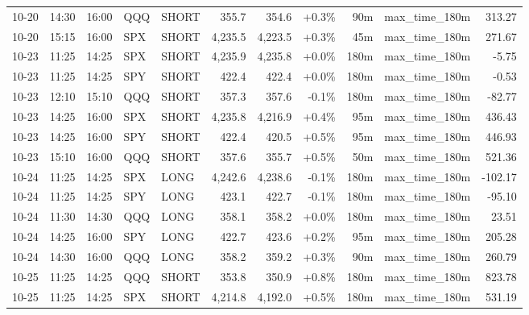 \documentclass[11pt,a4paper,twoside]{article}
\begin{document}
\begin{center}
\begin{longtable}{>{\color{txtmain}}l l l l l r r r r >{\color{txtmain}}l r}
10-20 & 14:30 & 16:00 & QQQ & SHORT & 355.7 & 354.6 & \textcolor{wingreen}{+0.3\%} & 90m & max\_time\_180m & \textcolor{wingreen}{313.27} \\
10-20 & 15:15 & 16:00 & SPX & SHORT & 4,235.5 & 4,223.5 & \textcolor{wingreen}{+0.3\%} & 45m & max\_time\_180m & \textcolor{wingreen}{271.67} \\
10-23 & 11:25 & 14:25 & SPX & SHORT & 4,235.9 & 4,235.8 & \textcolor{wingreen}{+0.0\%} & 180m & max\_time\_180m & \textcolor{lossred}{-5.75} \\
10-23 & 11:25 & 14:25 & SPY & SHORT & 422.4 & 422.4 & \textcolor{wingreen}{+0.0\%} & 180m & max\_time\_180m & \textcolor{lossred}{-0.53} \\
10-23 & 12:10 & 15:10 & QQQ & SHORT & 357.3 & 357.6 & \textcolor{lossred}{-0.1\%} & 180m & max\_time\_180m & \textcolor{lossred}{-82.77} \\
10-23 & 14:25 & 16:00 & SPX & SHORT & 4,235.8 & 4,216.9 & \textcolor{wingreen}{+0.4\%} & 95m & max\_time\_180m & \textcolor{wingreen}{436.43} \\
10-23 & 14:25 & 16:00 & SPY & SHORT & 422.4 & 420.5 & \textcolor{wingreen}{+0.5\%} & 95m & max\_time\_180m & \textcolor{wingreen}{446.93} \\
10-23 & 15:10 & 16:00 & QQQ & SHORT & 357.6 & 355.7 & \textcolor{wingreen}{+0.5\%} & 50m & max\_time\_180m & \textcolor{wingreen}{521.36} \\
10-24 & 11:25 & 14:25 & SPX & LONG & 4,242.6 & 4,238.6 & \textcolor{lossred}{-0.1\%} & 180m & max\_time\_180m & \textcolor{lossred}{-102.17} \\
10-24 & 11:25 & 14:25 & SPY & LONG & 423.1 & 422.7 & \textcolor{lossred}{-0.1\%} & 180m & max\_time\_180m & \textcolor{lossred}{-95.10} \\
10-24 & 11:30 & 14:30 & QQQ & LONG & 358.1 & 358.2 & \textcolor{wingreen}{+0.0\%} & 180m & max\_time\_180m & \textcolor{wingreen}{23.51} \\
10-24 & 14:25 & 16:00 & SPY & LONG & 422.7 & 423.6 & \textcolor{wingreen}{+0.2\%} & 95m & max\_time\_180m & \textcolor{wingreen}{205.28} \\
10-24 & 14:30 & 16:00 & QQQ & LONG & 358.2 & 359.2 & \textcolor{wingreen}{+0.3\%} & 90m & max\_time\_180m & \textcolor{wingreen}{260.79} \\
10-25 & 11:25 & 14:25 & QQQ & SHORT & 353.8 & 350.9 & \textcolor{wingreen}{+0.8\%} & 180m & max\_time\_180m & \textcolor{wingreen}{823.78} \\
10-25 & 11:25 & 14:25 & SPX & SHORT & 4,214.8 & 4,192.0 & \textcolor{wingreen}{+0.5\%} & 180m & max\_time\_180m & \textcolor{wingreen}{531.19} \\

\end{longtable}
\end{center}
\end{document}

